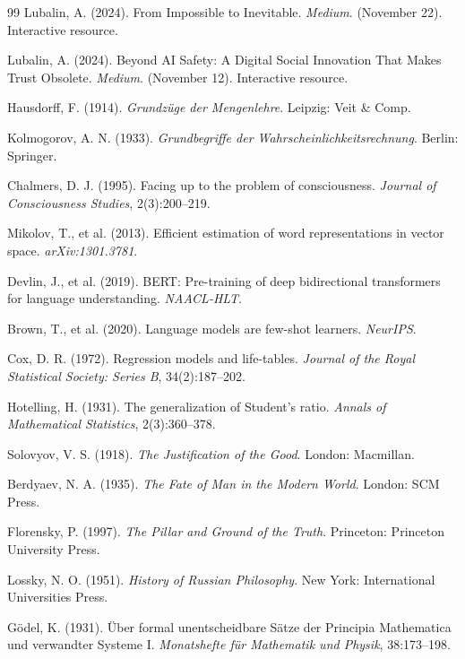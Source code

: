 \documentclass[11pt,a4paper]{article}
\theoremstyle{definition}
\theoremstyle{remark}
\begin{document}
\begin{small}
\begin{enumerate}
\begin{protocol}
\begin{thebibliography}{99}
Lubalin, A. (2024). From Impossible to Inevitable. \textit{Medium}. (November 22). Interactive resource.

Lubalin, A. (2024). Beyond AI Safety: A Digital Social Innovation That Makes Trust Obsolete. \textit{Medium}. (November 12). Interactive resource.

Hausdorff, F. (1914). \textit{Grundzüge der Mengenlehre}. Leipzig: Veit \& Comp.

Kolmogorov, A. N. (1933). \textit{Grundbegriffe der Wahrscheinlichkeitsrechnung}. Berlin: Springer.

Chalmers, D. J. (1995). Facing up to the problem of consciousness. \textit{Journal of Consciousness Studies}, 2(3):200–219.

Mikolov, T., et al. (2013). Efficient estimation of word representations in vector space. \textit{arXiv:1301.3781}.

Devlin, J., et al. (2019). BERT: Pre-training of deep bidirectional transformers for language understanding. \textit{NAACL-HLT}.

Brown, T., et al. (2020). Language models are few-shot learners. \textit{NeurIPS}.

Cox, D. R. (1972). Regression models and life-tables. \textit{Journal of the Royal Statistical Society: Series B}, 34(2):187–202.

Hotelling, H. (1931). The generalization of Student's ratio. \textit{Annals of Mathematical Statistics}, 2(3):360–378.

Solovyov, V. S. (1918). \textit{The Justification of the Good}. London: Macmillan.

Berdyaev, N. A. (1935). \textit{The Fate of Man in the Modern World}. London: SCM Press.

Florensky, P. (1997). \textit{The Pillar and Ground of the Truth}. Princeton: Princeton University Press.

Lossky, N. O. (1951). \textit{History of Russian Philosophy}. New York: International Universities Press.

Gödel, K. (1931). Über formal unentscheidbare Sätze der Principia Mathematica und verwandter Systeme I. \textit{Monatshefte für Mathematik und Physik}, 38:173–198.


\end{thebibliography}
\end{protocol}
\end{enumerate}
\end{small}
\end{document}
